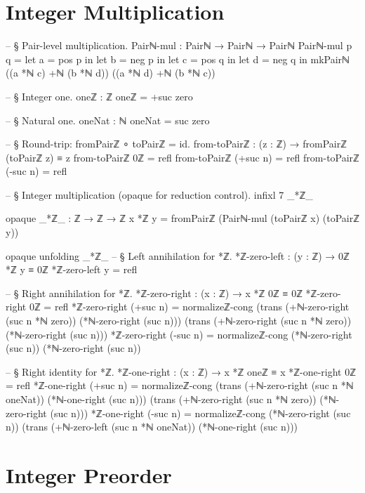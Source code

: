 \documentclass[11pt,a4paper]{book}
\begin{document}
\section{Integer Multiplication}

\begin{code}
-- § Pair-level multiplication.
Pairℕ-mul : Pairℕ → Pairℕ → Pairℕ
Pairℕ-mul p q =
  let a = pos p in
  let b = neg p in
  let c = pos q in
  let d = neg q in
  mkPairℕ ((a *ℕ c) +ℕ (b *ℕ d)) ((a *ℕ d) +ℕ (b *ℕ c))

-- § Integer one.
oneℤ : ℤ
oneℤ = +suc zero

-- § Natural one.
oneNat : ℕ
oneNat = suc zero

-- § Round-trip: fromPairℤ ∘ toPairℤ = id.
from-toPairℤ : (z : ℤ) → fromPairℤ (toPairℤ z) ≡ z
from-toPairℤ 0ℤ = refl
from-toPairℤ (+suc n) = refl
from-toPairℤ (-suc n) = refl

-- § Integer multiplication (opaque for reduction control).
infixl 7 _*ℤ_

opaque
  _*ℤ_ : ℤ → ℤ → ℤ
  x *ℤ y = fromPairℤ (Pairℕ-mul (toPairℤ x) (toPairℤ y))

opaque
  unfolding _*ℤ_
  -- § Left annihilation for *ℤ.
  *ℤ-zero-left : (y : ℤ) → 0ℤ *ℤ y ≡ 0ℤ
  *ℤ-zero-left y = refl

  -- § Right annihilation for *ℤ.
  *ℤ-zero-right : (x : ℤ) → x *ℤ 0ℤ ≡ 0ℤ
  *ℤ-zero-right 0ℤ = refl
  *ℤ-zero-right (+suc n) =
    normalizeℤ-cong
      (trans
        (+ℕ-zero-right (suc n *ℕ zero))
        (*ℕ-zero-right (suc n)))
      (trans
        (+ℕ-zero-right (suc n *ℕ zero))
        (*ℕ-zero-right (suc n)))
  *ℤ-zero-right (-suc n) =
    normalizeℤ-cong
      (*ℕ-zero-right (suc n))
      (*ℕ-zero-right (suc n))

  -- § Right identity for *ℤ.
  *ℤ-one-right : (x : ℤ) → x *ℤ oneℤ ≡ x
  *ℤ-one-right 0ℤ = refl
  *ℤ-one-right (+suc n) =
    normalizeℤ-cong
      (trans
        (+ℕ-zero-right (suc n *ℕ oneNat))
        (*ℕ-one-right (suc n)))
      (trans
        (+ℕ-zero-right (suc n *ℕ zero))
        (*ℕ-zero-right (suc n)))
  *ℤ-one-right (-suc n) =
    normalizeℤ-cong
      (*ℕ-zero-right (suc n))
      (trans
        (+ℕ-zero-left (suc n *ℕ oneNat))
        (*ℕ-one-right (suc n)))
\end{code}

\section{Integer Preorder}
\end{document}
